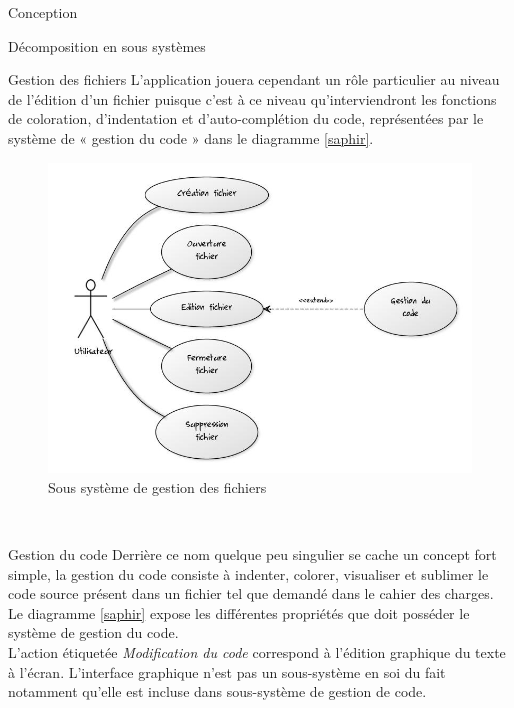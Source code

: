 \documentclass[a4paper, 12pt]{report}
\begin{document}
\begin{part}{Conception}
\begin{chapter}{Décomposition en sous systèmes}
\begin{section}{Gestion des fichiers}
				L'application jouera cependant un rôle particulier au niveau de l'édition d'un fichier puisque c'est à ce niveau qu'interviendront
				les fonctions de coloration, d'indentation et d'auto-complétion du code, représentées par le système de « gestion du code » dans le 
				diagramme \ref{saphir}. \\
				\begin{figure}[ht]
					\begin{center}
						\includegraphics[width=13cm]{images/gestionFichiers.jpg}
						\caption{Sous système de gestion des fichiers}
						\label{carabine}
					\end{center}
				\end{figure}~\\
			\end{section}
			\newpage %
			\begin{section}{Gestion du code}
				Derrière ce nom quelque peu singulier se cache un concept fort simple, la gestion du code consiste à indenter, colorer,
				visualiser et sublimer le code source présent dans un fichier tel que demandé dans le cahier des charges. Le diagramme \ref{saphir}
				expose les différentes propriétés que doit posséder le système de gestion du code.\\
				L'action étiquetée \emph{Modification du code} correspond à l'édition graphique du texte à l'écran. L'interface graphique
				n'est pas un sous-système en soi du fait notamment qu'elle est incluse dans sous-système de gestion de code.\\
				\begin{figure}[ht]
					\begin{center}

\end{center}
\end{figure}
\end{section}
\end{chapter}
\end{part}
\end{document}
